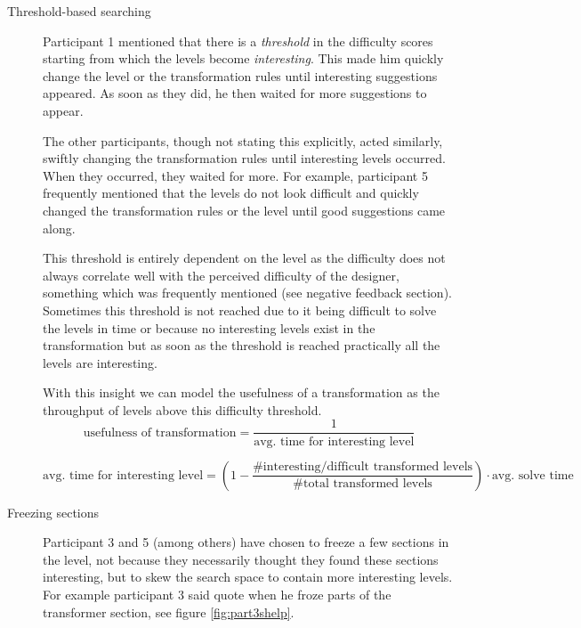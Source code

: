 \begin{description}

    \item[Threshold-based searching] 
Participant 1 mentioned that there is a \textit{threshold} in the difficulty scores starting from which the levels become \textit{interesting}. This made him quickly change the level or the transformation rules until interesting suggestions appeared. As soon as they did, he then waited for more suggestions to appear.

\textit{}

The other participants, though not stating this explicitly, acted similarly, swiftly changing the transformation rules until interesting levels occurred. When they occurred, they waited for more. For example, participant 5 frequently mentioned that the levels do not look difficult and quickly changed the transformation rules or the level until good suggestions came along.

    This threshold is entirely dependent on the level as the difficulty does not always correlate well with the perceived difficulty of the designer, something which was frequently mentioned (see negative feedback section). Sometimes this threshold is not reached due to it being difficult to solve the levels in time or because no interesting levels exist in the transformation but as soon as the threshold is reached practically all the levels are interesting.    

    With this insight we can model the usefulness of a transformation as the throughput of levels above this difficulty threshold.
\begin{equation}
\text{usefulness of transformation} = \frac{1}{\text{avg. time for interesting level}}
\label{eq:transformationusefulness}
\end{equation}
    
\begin{equation}
\text{avg. time for interesting level} = \left(1 - \frac{\text{\# interesting/difficult transformed levels}}{\text{\# total transformed levels}} \right) \cdot \text{avg. solve time}
\label{eq:transformationusefulness}
\end{equation}

    \item[Freezing sections] Participant 3 and 5 (among others) have chosen to freeze a few sections in the level, not because they necessarily thought they found these sections interesting, but to skew the search space to contain more interesting levels. For example participant 3 said quote \textit{} when he froze parts of the transformer section, see figure \ref{fig:part3shelp}.
    

\end{description}
